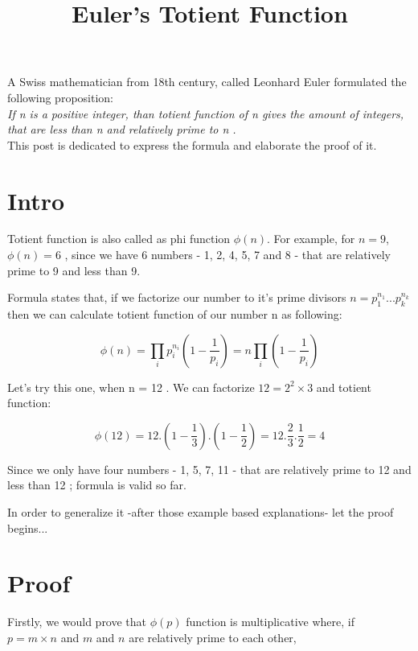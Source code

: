\documentclass[11pt]{article}
\title{\textbf{Euler's Totient Function}}
\date{}
\begin{document}
\maketitle

A Swiss mathematician from 18th century, called Leonhard Euler formulated the following proposition: \\

\textit{If n is a positive integer, than totient function of n gives the amount of integers, that are less than n and relatively prime to n .} \\

This post is dedicated to express the formula and elaborate the proof of it.

\section{Intro}

Totient function is also called as phi function $\phi(n)$. For example, for $n=9$, $\phi(n) = 6$ , since we have 6 numbers - 1, 2, 4, 5, 7 and 8 - that are relatively prime to 9 and less than 9.

 Formula states that, if we factorize our number to it's prime divisors $n = p_{1}^{n_1} ...p_{k}^{n_k}$ then we can calculate totient function of our number n as following: 

\begin{equation}
\phi(n) = \prod\limits_{i} p_{i}^{n_i} (1 - \frac{1}{p_{i}}) = n \prod\limits_{i}(1 - \frac{1}{p_i})
\end{equation}

Let's try this one, when n = 12 . We can factorize $12 = 2^2 \times 3$ and totient function: 

\begin{equation}
\phi(12) = 12 . (1 - \frac{1}{3}) . (1 - \frac{1}{2}) = 12 . \frac{2}{3} . \frac{1}{2} = 4 
\end{equation}

Since we only have four numbers - 1, 5, 7, 11 - that are relatively prime to 12 and less than 12 ; formula is valid so far.

In order to generalize it -after those example based explanations- let the proof begins...

\section{Proof}
Firstly, we would prove that $\phi(p)$ function is multiplicative where, if \\
$p = m \times n$ and $m$ and $n$ are relatively prime to each other,
\end{document}
